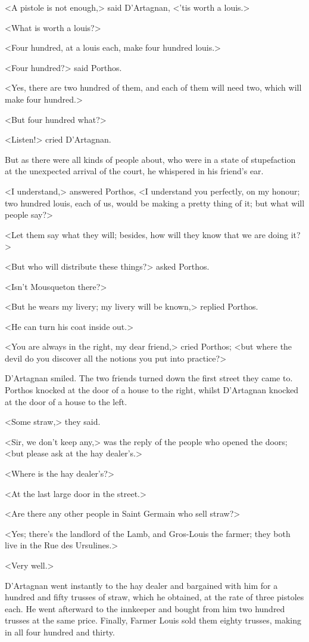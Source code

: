 <A pistole is not enough,> said D'Artagnan, <'tis worth a louis.>

<What is worth a louis?>

<Four hundred, at a louis each, make four hundred louis.>

<Four hundred?> said Porthos.

<Yes, there are two hundred of them, and each of them will need two, which will make four hundred.>

<But four hundred what?>

<Listen!> cried D'Artagnan.

But as there were all kinds of people about, who were in a state of stupefaction at the unexpected arrival of the court, he whispered in his friend's ear.

<I understand,> answered Porthos, <I understand you perfectly, on my honour; two hundred louis, each of us, would be making a pretty thing of it; but what will people say?>

<Let them say what they will; besides, how will they know that we are doing it?>

<But who will distribute these things?> asked Porthos.

<Isn't Mousqueton there?>

<But he wears my livery; my livery will be known,> replied Porthos.

<He can turn his coat inside out.>

<You are always in the right, my dear friend,> cried Porthos; <but where the devil do you discover all the notions you put into practice?>

D'Artagnan smiled. The two friends turned down the first street they came to. Porthos knocked at the door of a house to the right, whilst D'Artagnan knocked at the door of a house to the left.

<Some straw,> they said.

<Sir, we don't keep any,> was the reply of the people who opened the doors; <but please ask at the hay dealer's.>

<Where is the hay dealer's?>

<At the last large door in the street.>

<Are there any other people in Saint Germain who sell straw?>

<Yes; there's the landlord of the Lamb, and Gros-Louis the farmer; they both live in the Rue des Ursulines.>

<Very well.>

D'Artagnan went instantly to the hay dealer and bargained with him for a hundred and fifty trusses of straw, which he obtained, at the rate of three pistoles each. He went afterward to the innkeeper and bought from him two hundred trusses at the same price. Finally, Farmer Louis sold them eighty trusses, making in all four hundred and thirty.

